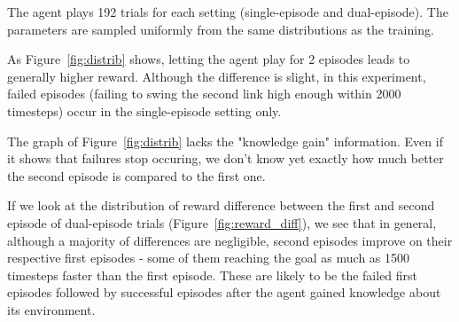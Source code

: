 \documentclass[letterpaper]{article}
\begin{document}
The agent plays 192 trials for each setting (single-episode and dual-episode).
The parameters are sampled uniformly from the same distributions as the training.

As Figure~\ref{fig:distrib} shows, letting the agent play for 2 episodes
leads to generally higher reward. Although the difference is slight, 
in this experiment, failed episodes (failing
to swing the second link high enough within 2000 timesteps) occur in the
single-episode setting only.

The graph of Figure~\ref{fig:distrib} lacks the "knowledge gain" information.
Even if it shows that failures stop occuring, we don't know yet exactly how
much better the second episode is compared to the first one.

If we look at the distribution of reward difference between the first
and second episode of dual-episode trials (Figure~\ref{fig:reward_diff}), we 
see that in general, although a majority of differences are negligible,
second episodes improve on their respective first episodes - some of them
reaching the goal as much as 1500 timesteps faster than the first episode. These
are likely to be the failed first episodes followed by successful episodes
after the agent gained knowledge about its environment.
\end{document}
